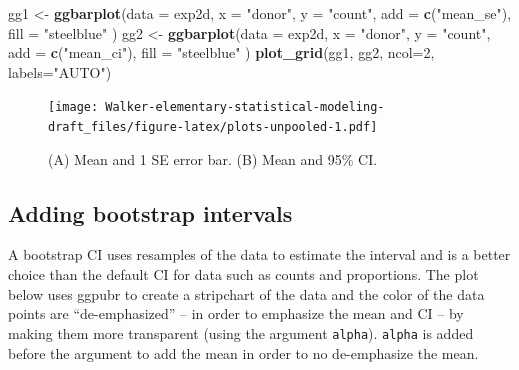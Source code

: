 \documentclass[]{book}
\newenvironment{Shaded}{\begin{snugshade}}{\end{snugshade}}
\newcommand{\DataTypeTok}[1]{\textcolor[rgb]{0.13,0.29,0.53}{#1}}
\newcommand{\DecValTok}[1]{\textcolor[rgb]{0.00,0.00,0.81}{#1}}
\newcommand{\KeywordTok}[1]{\textcolor[rgb]{0.13,0.29,0.53}{\textbf{#1}}}
\newcommand{\NormalTok}[1]{#1}
\newcommand{\StringTok}[1]{\textcolor[rgb]{0.31,0.60,0.02}{#1}}
\begin{document}
\begin{Shaded}
\begin{Highlighting}[]
\NormalTok{gg1 <-}\StringTok{ }\KeywordTok{ggbarplot}\NormalTok{(}\DataTypeTok{data =}\NormalTok{ exp2d,}
                 \DataTypeTok{x =} \StringTok{"donor"}\NormalTok{, }
                 \DataTypeTok{y =} \StringTok{"count"}\NormalTok{, }
                 \DataTypeTok{add =} \KeywordTok{c}\NormalTok{(}\StringTok{"mean_se"}\NormalTok{),}
                 \DataTypeTok{fill =} \StringTok{"steelblue"}
\NormalTok{)}
\NormalTok{gg2 <-}\StringTok{ }\KeywordTok{ggbarplot}\NormalTok{(}\DataTypeTok{data =}\NormalTok{ exp2d,}
                 \DataTypeTok{x =} \StringTok{"donor"}\NormalTok{, }
                 \DataTypeTok{y =} \StringTok{"count"}\NormalTok{, }
                 \DataTypeTok{add =} \KeywordTok{c}\NormalTok{(}\StringTok{"mean_ci"}\NormalTok{),}
                 \DataTypeTok{fill =} \StringTok{"steelblue"}
\NormalTok{)}
\KeywordTok{plot_grid}\NormalTok{(gg1, gg2, }\DataTypeTok{ncol=}\DecValTok{2}\NormalTok{, }\DataTypeTok{labels=}\StringTok{"AUTO"}\NormalTok{)}
\end{Highlighting}
\end{Shaded}

\begin{figure}
\centering
\texttt{[image: Walker-elementary-statistical-modeling-draft\_files/figure-latex/plots-unpooled-1.pdf]}
\caption{\label{fig:plots-unpooled}(A) Mean and 1 SE error bar. (B) Mean and 95\% CI.}
\end{figure}

\hypertarget{adding-bootstrap-intervals}{%
\subsection{Adding bootstrap intervals}\label{adding-bootstrap-intervals}}

A bootstrap CI uses resamples of the data to estimate the interval and is a better choice than the default CI for data such as counts and proportions. The plot below uses ggpubr to create a stripchart of the data and the color of the data points are ``de-emphasized'' -- in order to emphasize the mean and CI -- by making them more transparent (using the argument \texttt{alpha}). \texttt{alpha} is added before the argument to add the mean in order to no de-emphasize the mean.
\end{document}
